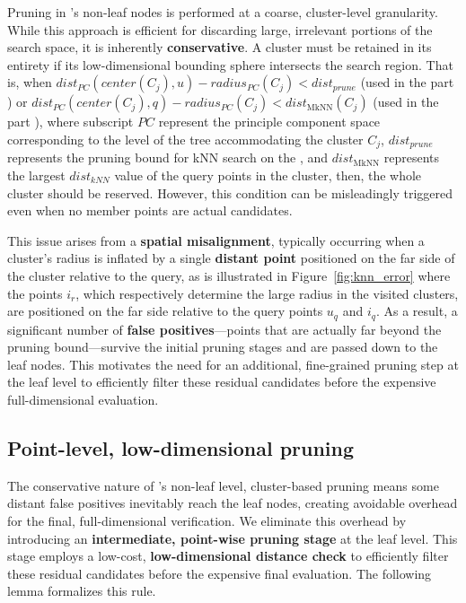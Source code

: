 Pruning in \dualtree's non-leaf nodes is performed at a coarse, cluster-level granularity. While this approach is efficient for discarding large, irrelevant portions of the search space, it is inherently \textbf{conservative}. A cluster must be retained in its entirety if its low-dimensional bounding sphere intersects the search region. That is, when $dist_{PC}(center(C_j), u)-radius_{PC}(C_j)<dist_{prune}$ (used in the \deltatree part \cite{cui2003contorting}) or $dist_{PC}(center(C_j), q) - radius_{PC}(C_j) < dist_\text{MkNN}(C_j)$ (used in the \hdrtree part \cite{yang2014continuous}), where subscript $PC$ represent the principle component space corresponding to the level of the tree accommodating the cluster $C_j$, $dist_{prune}$ represents the pruning bound for kNN search on the \deltatree, and $dist_\text{MkNN}$ represents the largest $dist_{kNN}$ value of the query points in the cluster, then, the whole cluster should be reserved. However, this condition can be misleadingly triggered even when no member points are actual candidates.

This issue arises from a \textbf{spatial misalignment}, typically occurring when a cluster's radius is inflated by a single \textbf{distant point} positioned on the far side of the cluster relative to the query, as is illustrated in Figure~\ref{fig:knn_error} where the points $i_r$, which respectively determine the large radius in the visited clusters, are positioned on the far side relative to the query points $u_q$ and $i_q$. As a result, a significant number of \textbf{false positives}---points that are actually far beyond the pruning bound---survive the initial pruning stages and are passed down to the leaf nodes. This motivates the need for an additional, fine-grained pruning step at the leaf level to efficiently filter these residual candidates before the expensive full-dimensional evaluation.

\subsection{Point-level, low-dimensional pruning }

The conservative nature of \dualtree's non-leaf level, cluster-based pruning means some distant false positives inevitably reach the leaf nodes, creating avoidable overhead for the final, full-dimensional verification. We eliminate this overhead by introducing an \textbf{intermediate, point-wise pruning stage} at the leaf level. This stage employs a low-cost, \textbf{low-dimensional distance check} to efficiently filter these residual candidates before the expensive final evaluation. The following lemma formalizes this rule.

